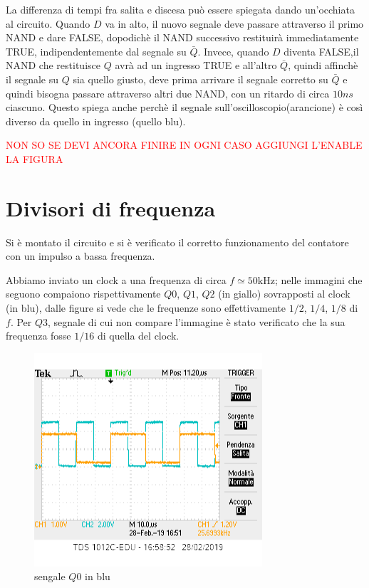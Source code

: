 \documentclass[10pt,a4paper]{article}
\begin{document}
La differenza di tempi fra salita e discesa può essere spiegata dando un'occhiata al circuito. Quando $D$ va in alto, il nuovo segnale deve passare attraverso il primo NAND e dare FALSE, dopodichè il NAND successivo restituirà immediatamente TRUE, indipendentemente dal segnale su $\bar{Q}$. Invece, quando $D$ diventa FALSE,il NAND che restituisce $Q$ avrà ad un ingresso TRUE e all'altro $\bar{Q}$, quindi affinchè il segnale su $Q$ sia quello giusto, deve prima arrivare il segnale corretto su $\bar{Q}$ e quindi bisogna passare attraverso altri due NAND, con un ritardo di circa $10 ns$ ciascuno. Questo spiega anche perchè il segnale sull'oscilloscopio(arancione) è così diverso da quello in ingresso (quello blu).

\textcolor{red}{NON SO SE DEVI ANCORA FINIRE IN OGNI CASO AGGIUNGI L'ENABLE LA FIGURA}



\section{ Divisori di frequenza }

Si è montato il circuito e si è verificato il corretto funzionamento del contatore con un impulso a bassa frequenza.



Abbiamo inviato un clock a una frequenza di circa $f\simeq 50 \si{\kilo \hertz}$; nelle immagini che seguono compaiono  rispettivamente $Q0$, $Q1$, $Q2$  (in giallo) sovrapposti al clock (in blu), dalle figure si vede che le frequenze sono effettivamente $1/2$, $1/4$, $1/8$ di $f$. Per $Q3$, segnale di cui non compare l'immagine è stato verificato che la sua frequenza fosse $1/16$ di quella del clock.

\begin{figure}[h]

			\centering

			\includegraphics[scale=0.85]{1mezzo}

			\caption{sengale $Q0$ in blu}

			\label{fig:plh}

\end{figure}
\end{document}
